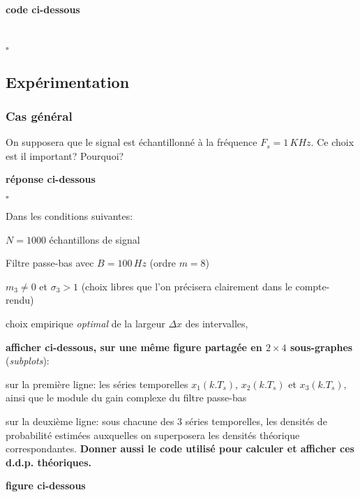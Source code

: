 \documentclass{article}
\newcommand{\debutrep}[1]{\color{blue}\begin{center} \hrulefill \textbf{ #1 } \hrulefill \end{center} }
\newcommand{\finrep}{\vspace*{5mm}\hfill $\square$\color{black}\vspace*{5mm}}
\begin{document}
\debutrep{code ci-dessous}
 \begin{verbatim}
 
 \end{verbatim}
\finrep

\subsection{Expérimentation}

\subsubsection{Cas général}

On supposera que le signal est échantillonné à la fréquence $F_s = 1\,KHz$. Ce choix est il important? Pourquoi?

\debutrep{réponse ci-dessous}
 
 \finrep
 
Dans les conditions suivantes:
\begin{list}{-}{\setlength{\leftmargin}{3mm} \setlength{\labelwidth}{20mm} \setlength{\labelsep}{2mm} \setlength{\itemsep}{1mm} }
\item $N=1000$ échantillons de signal
\item Filtre passe-bas avec $B=100\,Hz$ (ordre $m=8$)
\item $m_3 \neq 0$ et $\sigma_3 >1$ (choix libres que l'on précisera clairement dans le compte-rendu)
\item choix empirique {\em optimal} de la largeur $\Delta x$ des intervalles,
\end{list}

\textbf{afficher ci-dessous, sur une même figure partagée en $2 \times 4$ sous-graphes} ({\em subplots}):
\begin{list}{-}{\setlength{\leftmargin}{3mm} \setlength{\labelwidth}{20mm} \setlength{\labelsep}{2mm} \setlength{\itemsep}{1mm} }
\item sur la première ligne: les séries temporelles $x_1(k.T_s)$, $x_2(k.T_s)$ et $x_3(k.T_s)$, ainsi que le module du gain complexe du filtre passe-bas
\item sur la deuxième ligne: sous chacune des 3 séries temporelles, les densités de probabilité estimées auxquelles on superposera les densités théorique correspondantes. \textbf{Donner aussi le code utilisé pour calculer et afficher ces d.d.p. théoriques.}
\end{list}

\debutrep{figure ci-dessous}
\end{document}
